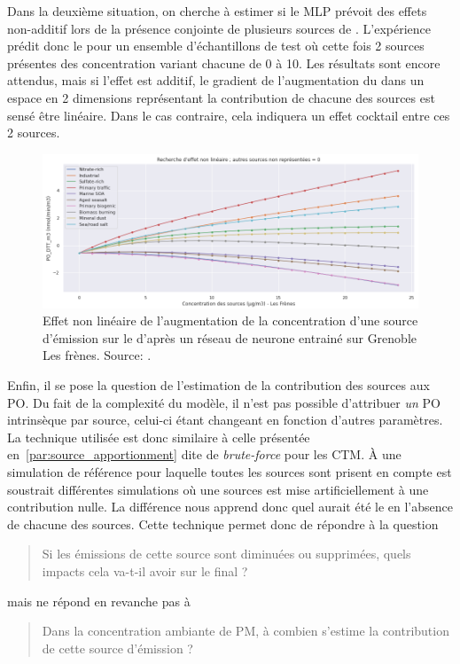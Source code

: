 Dans la deuxième situation, on cherche à estimer si le MLP prévoit des effets non-additif
lors de la présence conjointe de plusieurs sources de \PMdix. L'expérience prédit donc le
\PODTTv{} pour un ensemble d'échantillons de test où cette fois 2 sources présentes des
concentration variant chacune de 0 à \SI{10}{\ugm}. Les résultats sont encore attendus,
mais si l'effet est additif, le gradient de l'augmentation du \PODTTv{} dans un espace en
2 dimensions représentant la contribution de chacune des sources est sensé être linéaire.
Dans le cas contraire, cela indiquera un effet cocktail entre ces 2 sources.

\begin{figure}[ht]
    \centering
    \includegraphics[width=0.8\linewidth]{figures/chapter05/10sourcesLinearite.PNG}
    \caption{Effet non linéaire de l'augmentation de la concentration d'une source
        d'émission sur le \PODTTv{} d'après un réseau de neurone entrainé sur Grenoble Les
    frènes. Source: \cite{fichesMachine2020}.}%
    \label{fig:figures/chapter05/10sourcesLinearite}
\end{figure}

Enfin, il se pose la question de l'estimation de la contribution des sources aux PO. Du
fait de la complexité du modèle, il n'est pas possible d'attribuer \emph{un} PO
intrinsèque par source, celui-ci étant changeant en fonction d'autres paramètres.
La technique utilisée est donc similaire à celle présentée
en~\ref{par:source_apportionment} dite de \textit{brute-force} pour les CTM. À une
simulation de référence pour laquelle toutes les sources sont prisent en compte est
soustrait différentes simulations où une sources est mise artificiellement à une
contribution nulle.  La différence nous apprend donc quel aurait été le \POv{} en
l'absence de chacune des sources.
Cette technique permet donc de répondre à la question
\begin{quote}
   Si les émissions de cette source sont diminuées ou supprimées, quels impacts cela va-t-il
   avoir sur le \POv{} final ?
\end{quote}
mais ne répond en revanche pas à
\begin{quote}
   Dans la concentration ambiante de PM, à combien s'estime la contribution de cette source
   d'émission ?
\end{quote}


